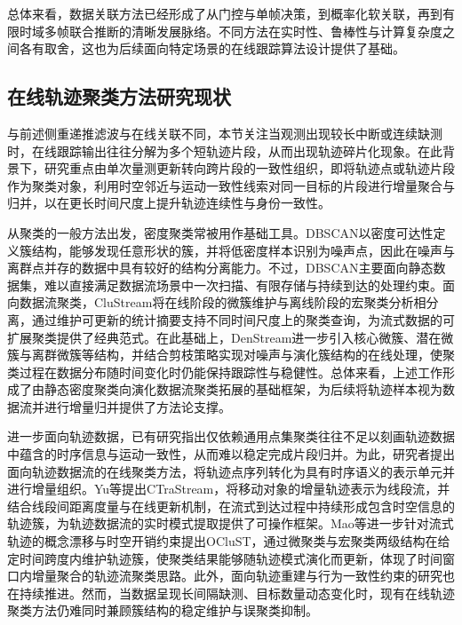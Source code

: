 \documentclass{xdupgthesis}
\begin{document}
总体来看，数据关联方法已经形成了从门控与单帧决策，到概率化软关联，再到有限时域多帧联合推断的清晰发展脉络。不同方法在实时性、鲁棒性与计算复杂度之间各有取舍，这也为后续面向特定场景的在线跟踪算法设计提供了基础。

\subsection{在线轨迹聚类方法研究现状}
与前述侧重递推滤波与在线关联不同，本节关注当观测出现较长中断或连续缺测时，在线跟踪输出往往分解为多个短轨迹片段，从而出现轨迹碎片化现象。在此背景下，研究重点由单次量测更新转向跨片段的一致性组织，即将轨迹点或轨迹片段作为聚类对象，利用时空邻近与运动一致性线索对同一目标的片段进行增量聚合与归并，以在更长时间尺度上提升轨迹连续性与身份一致性\cite{wang2021trajectorysurvey,wang2024reconstruction}。

从聚类的一般方法出发，密度聚类常被用作基础工具。DBSCAN以密度可达性定义簇结构，能够发现任意形状的簇，并将低密度样本识别为噪声点，因此在噪声与离群点并存的数据中具有较好的结构分离能力\cite{ester1996dbscan}。不过，DBSCAN主要面向静态数据集，难以直接满足数据流场景中一次扫描、有限存储与持续到达的处理约束。面向数据流聚类，CluStream将在线阶段的微簇维护与离线阶段的宏聚类分析相分离，通过维护可更新的统计摘要支持不同时间尺度上的聚类查询，为流式数据的可扩展聚类提供了经典范式\cite{aggarwal2003clustream}。在此基础上，DenStream进一步引入核心微簇、潜在微簇与离群微簇等结构，并结合剪枝策略实现对噪声与演化簇结构的在线处理，使聚类过程在数据分布随时间变化时仍能保持跟踪性与稳健性\cite{cao2006denstream}。总体来看，上述工作形成了由静态密度聚类向演化数据流聚类拓展的基础框架，为后续将轨迹样本视为数据流并进行增量归并提供了方法论支撑。

进一步面向轨迹数据，已有研究指出仅依赖通用点集聚类往往不足以刻画轨迹数据中蕴含的时序信息与运动一致性，从而难以稳定完成片段归并。为此，研究者提出面向轨迹数据流的在线聚类方法，将轨迹点序列转化为具有时序语义的表示单元并进行增量组织。Yu等提出CTraStream，将移动对象的增量轨迹表示为线段流，并结合线段间距离度量与在线更新机制，在流式到达过程中持续形成包含时空信息的轨迹簇，为轨迹数据流的实时模式提取提供了可操作框架\cite{yu2013ctra}。Mao等进一步针对流式轨迹的概念漂移与时空开销约束提出OCluST，通过微聚类与宏聚类两级结构在给定时间跨度内维护轨迹簇，使聚类结果能够随轨迹模式演化而更新，体现了时间窗口内增量聚合的轨迹流聚类思路\cite{mao2018oclust}。此外，面向轨迹重建与行为一致性约束的研究也在持续推进\cite{zhao2024behaviouraloc}。然而，当数据呈现长间隔缺测、目标数量动态变化时，现有在线轨迹聚类方法仍难同时兼顾簇结构的稳定维护与误聚类抑制。
\end{document}
